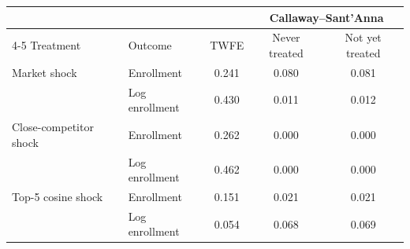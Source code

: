 \begin{tabular}{llccc}
\toprule
 & & & \multicolumn{2}{c}{Callaway--Sant'Anna} \\
\cmidrule(lr){4-5}
Treatment & Outcome & TWFE & Never treated & Not yet treated \\
\midrule
Market shock & Enrollment & 0.241 & 0.080 & 0.081 \\
 & Log enrollment & 0.430 & 0.011 & 0.012 \\
\addlinespace
Close-competitor shock & Enrollment & 0.262 & 0.000 & 0.000 \\
 & Log enrollment & 0.462 & 0.000 & 0.000 \\
\addlinespace
Top-5 cosine shock & Enrollment & 0.151 & 0.021 & 0.021 \\
 & Log enrollment & 0.054 & 0.068 & 0.069 \\
\bottomrule
\end{tabular}
